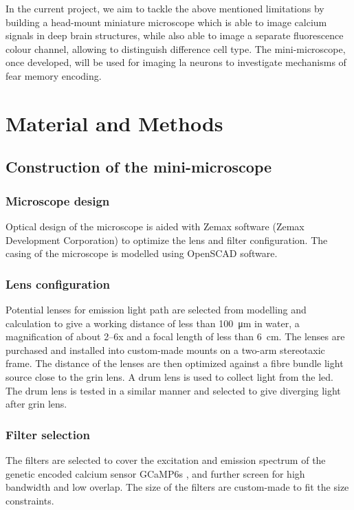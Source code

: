     In the current project, we aim to tackle the above mentioned limitations by building a head-mount miniature microscope which is able to image calcium signals in deep brain structures, while also able to image a separate fluorescence colour channel, allowing to distinguish difference cell type. The mini-microscope, once developed, will be used for imaging \gls{la} neurons to investigate mechanisms of fear memory encoding.


\section{Material and Methods}

\subsection{Construction of the mini-microscope}

\subsubsection{Microscope design}
Optical design of the microscope is aided with Zemax software (Zemax Development Corporation) to optimize the lens and filter configuration. The casing of the microscope is modelled using OpenSCAD software. 

\subsubsection{Lens configuration}



Potential lenses for emission light path are selected from modelling and calculation to give a working distance of less than \SI{100}{\um} in water, a magnification of about 2--6x and a focal length of less than \SI{6}{\cm}. The lenses are purchased and installed into custom-made mounts on a two-arm stereotaxic frame. The distance of the lenses are then optimized against a fibre bundle light source close to the \gls{grin} lens. A drum lens is used to collect light from the \gls{led}. The drum lens is tested in a similar manner and selected to give diverging light after \gls{grin} lens.

\subsubsection{Filter selection}
The filters are selected to cover the excitation and emission spectrum of the genetic encoded calcium sensor GCaMP6s \citep{chen13}, and further screen for high bandwidth and low overlap. The size of the filters are custom-made to fit the size constraints.

